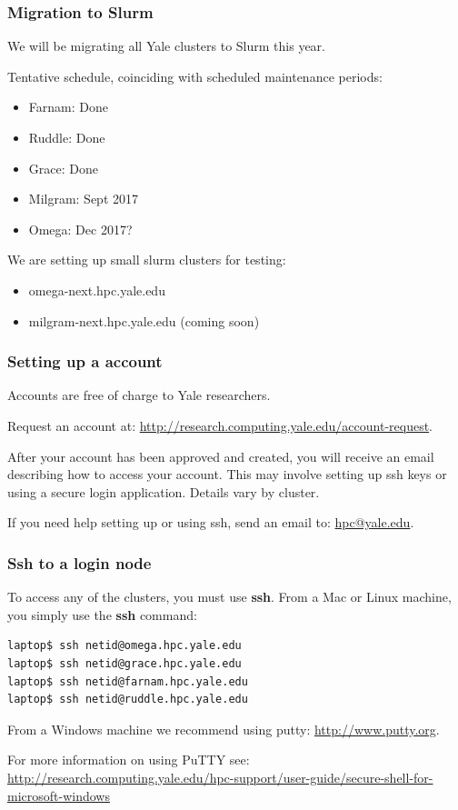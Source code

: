 \documentclass[10pt]{beamer}
\begin{document}
\begin{frame}[fragile]
\frametitle{Migration to Slurm}
We will be migrating all Yale clusters to Slurm this year.    

Tentative schedule, coinciding with scheduled maintenance periods:
\begin{itemize}
\item Farnam: Done
\item Ruddle: Done
\item Grace: Done
\item Milgram: Sept 2017
\item Omega: Dec 2017?
\end{itemize}

We are setting up small slurm clusters for testing:
\begin{itemize}
\item omega-next.hpc.yale.edu 
\item milgram-next.hpc.yale.edu (coming soon)
\end{itemize}
\end{frame}

\begin{frame}[fragile]
\frametitle{Setting up a account}

Accounts are free of charge to Yale researchers.
\vskip10pt

Request an account at: \url{http://research.computing.yale.edu/account-request}.

\vskip10pt
After your account has been approved and created, you will receive
an email describing how to access your account.  This may involve setting up ssh keys or 
using a secure login application.  Details vary by cluster.

\vskip10pt
If you need help setting up or using ssh, send an email to: \url{hpc@yale.edu}.
\end{frame}

\begin{frame}[fragile]
\frametitle{Ssh to a login node}
To access any of the clusters, you must use \textbf{ssh}.
From a Mac or Linux machine, you simply use the \textbf{ssh} command:

\begin{verbatim}
laptop$ ssh netid@omega.hpc.yale.edu
laptop$ ssh netid@grace.hpc.yale.edu
laptop$ ssh netid@farnam.hpc.yale.edu
laptop$ ssh netid@ruddle.hpc.yale.edu
\end{verbatim}

From a Windows machine we recommend using putty: \url{http://www.putty.org}.

\vskip10pt
For more information on using PuTTY see:
\url{http://research.computing.yale.edu/hpc-support/user-guide/secure-shell-for-microsoft-windows}
\end{frame}
\end{document}
